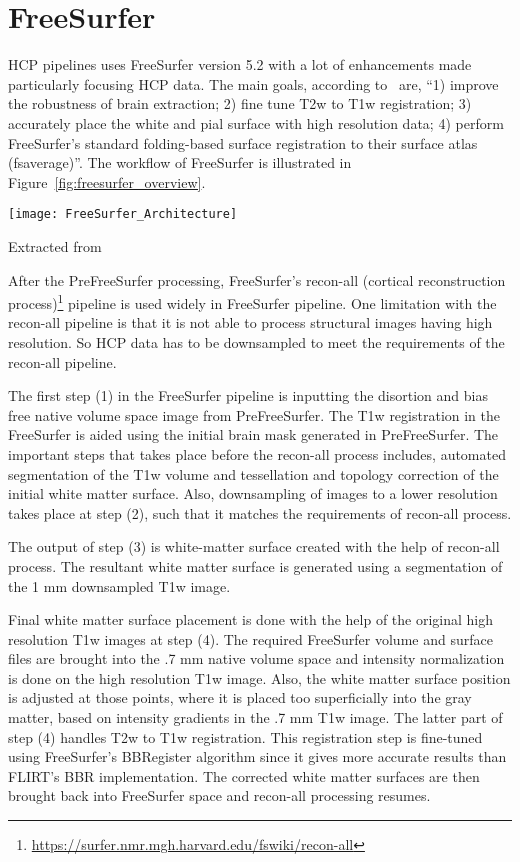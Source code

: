 \section{FreeSurfer} \label{sec:FreeSurfer}
HCP pipelines uses FreeSurfer version 5.2 with a lot of enhancements made particularly focusing HCP data. The main goals, according to~\cite{Gla13} are, ``1) improve the robustness of brain extraction; 2) fine tune T2w to T1w registration; 3) accurately place the white and pial surface with high resolution data; 4) perform FreeSurfer's standard folding-based surface registration to their surface atlas (fsaverage)''. The workflow of FreeSurfer is illustrated in Figure~\ref{fig:freesurfer_overview}.

\begin{center}
  \texttt{[image: FreeSurfer\_Architecture]}
  \label{fig:freesurfer_overview}
  \caption*{Extracted from \cite{Gla13}}
\end{center}

After the PreFreeSurfer processing, FreeSurfer's recon-all (cortical reconstruction process)\footnote{\url{https://surfer.nmr.mgh.harvard.edu/fswiki/recon-all}} pipeline is used widely in FreeSurfer pipeline. One limitation with the recon-all pipeline is that it is not able to process structural images having high resolution. So HCP data has to be downsampled to meet the requirements of the recon-all pipeline.

The first step (1) in the FreeSurfer pipeline is inputting the disortion and bias free native volume space image from PreFreeSurfer. The T1w registration in the FreeSurfer is aided using the initial brain mask generated in PreFreeSurfer. The important steps that takes place before the recon-all process includes, automated segmentation of the T1w volume and tessellation and topology correction of the initial white matter surface. Also, downsampling of images to a lower resolution takes place at step (2), such that it matches the requirements of recon-all process.

The output of step (3) is white-matter surface created with the help of recon-all process. The resultant white matter surface is generated using a segmentation of the 1 mm downsampled T1w image.

Final white matter surface placement is done with the help of the original high resolution T1w images at step (4). The required FreeSurfer volume and surface files are brought into the .7 mm native volume space and intensity normalization is done on the high resolution T1w image. Also, the white matter surface position is adjusted at those points, where it is placed too superficially into the gray matter, based on intensity gradients in the .7 mm T1w image. The latter part of step (4) handles T2w to T1w registration. This registration step is fine-tuned using FreeSurfer's BBRegister algorithm since it gives more accurate results than FLIRT's BBR implementation. The corrected white matter surfaces are then brought back into FreeSurfer space and recon-all processing resumes.

